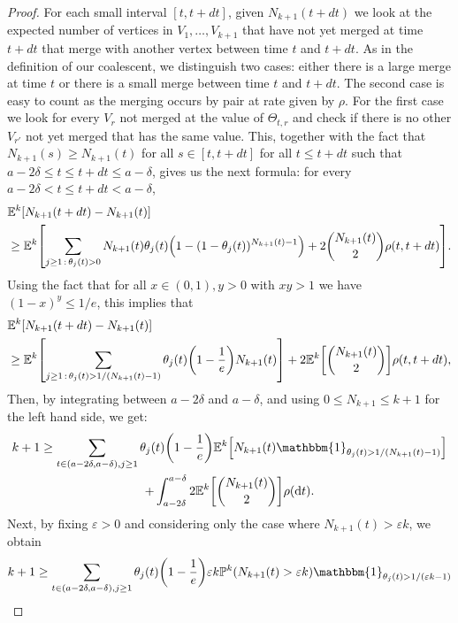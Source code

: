 \documentclass[10pt]{amsart}
\theoremstyle{definition}\newtheorem{defi}[theo]{Definition}\newtheorem{rema}[theo]{Remark}\newtheorem{exam}[theo]{Example}\newtheorem{exem}[theo]{Example}\newtheorem{nota}[theo]{Notation}
\newcommand{\probak}[1]{\mathbb{P}^k\left(#1\right)}
\newcommand{\e}{\varepsilon}
\newcommand{\rmd}{\mathrm{d}}
\newcommand{\E}{\mathbb{E}}
\newcommand{\1}{\mathbbm{1}}
\let\originalleft\left
\let\originalright\right
\renewcommand{\left}{\mathopen{}\mathclose\bgroup\originalleft}
\renewcommand{\right}{\aftergroup\egroup\originalright}
\begin{document}
\begin{proof}
For each small interval $[t,t+dt]$, given $N_{k+1}(t+dt)$ {we look} at the expected number of vertices in $V_1,\dots, V_{k+1}$ that have not yet merged at time $t+dt$ that merge with another vertex between time $t$ and $t+dt$. As in the definition of our coalescent, we distinguish two cases: either there is a large merge at time $t$ or there is a small merge between time $t$ and $t+dt$. The second case is easy to count as the merging occurs by pair at rate given by $\rho$. For the first case we look for every $V_r$ not merged at the value of $\Theta_{t,r}$ and check if there is no other $V_{r'}$ not yet merged that {has} the same value. This, together with the fact that $N_{k+1}(s)\ge N_{k+1}(t)$ for all $s\in [t,t+dt]$ {for all $t\le t+dt$ such that $a-2\delta \le t \le t+dt \le a-\delta$}, gives us the next formula: for every $a-2\delta<t\le t+dt<a-\delta$,
\begin{align*}
&\E^k [N_{k+1}(t+dt)-N_{k+1}(t)] \\
&\geq \E^k \left[\sum_{j\geq 1\,:\,\theta_j(t)>0} N_{k+1}(t)\theta_j(t)\left(1-(1-\theta_j(t))^{N_{k+1}(t)-1}\right) +2\binom{N_{k+1}(t)}{2}\rho(t,t+dt)\right].
\end{align*}
Using the fact that for all $x\in (0,1),y>0$ with $xy>1$ we have $(1-x)^y\leq 1/e$, this implies that
\begin{align*}
&\E^k[N_{k+1}(t+dt)-N_{k+1}(t)]\\
&\geq \E^k\left[\sum_{j\geq 1\,:\, \theta_j(t)>1/(N_{k+1}(t)-1)} \theta_j(t) \left(1-\frac{1}{e} \right){N_{k+1}(t)} \right]+2\E^k\left[\binom{N_{k+1}(t)}{2}\right]\rho(t,t+dt),
\end{align*}
Then, by integrating between $a-2\delta$ and $a-\delta$, and using $0\leq N_{k+1}\leq k+1$ for the left hand side, we get:
\begin{multline*}
k+1 \geq \sum_{\substack{ t\in (a-2\delta,a-\delta), j\geq 1}} \theta_j(t) \left(1- \frac{1}{e}\right)\E^k\left [{N_{k+1}(t)}\1_{\theta_j(t)>1/\left(N_{k+1}(t)-1\right)} \right]\\
+\int_{a-2\delta}^{a-\delta} 2\E^k \left [\binom{N_{k+1}(t)}{2}\right]\rho(\rmd t).
\end{multline*}
Next, by fixing $\e>0$ and considering only the case where $N_{k+1}(t)>\e k$, we obtain
\begin{multline*}
k+1 \geq \sum_{\substack{ t\in (a-2\delta,a-\delta), j\geq 1}} \theta_j(t) \left(1-\frac{1}{e}\right){\e k}\probak{N_{k+1}(t)>\e k}
\1_{\theta_j(t)>1/(\e k-1)}\\

\end{multline*}
\end{proof}
\end{document}
